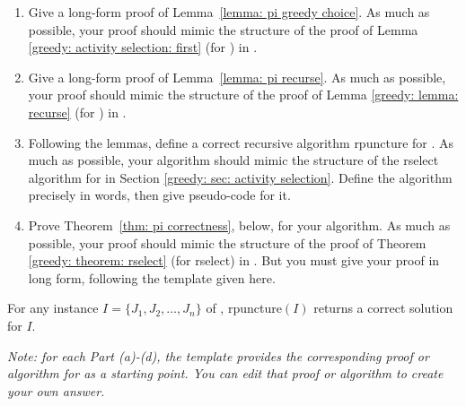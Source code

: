 \documentclass[11pt]{article}
\begin{document}
  \begin{enumerate}[label=(\alph*)]
  \item Give a long-form proof of Lemma~\ref{lemma: pi greedy choice}.
    As much as possible, your proof should mimic the structure of the proof of Lemma \ref{greedy: activity selection: first} (for )
    in .

  \item Give a long-form proof of Lemma~\ref{lemma: pi recurse}.
    As much as possible, your proof should mimic the structure of the proof of Lemma \ref{greedy: lemma: recurse} (for )
    in .

  \item Following the lemmas, 
    define a correct recursive algorithm \textsf{rpuncture} for .
    As much as possible, your algorithm should mimic the structure
    of the \textsf{rselect} algorithm for 
    in Section \ref{greedy: sec: activity selection}.
    Define the algorithm precisely in words, then give pseudo-code for it.

  \item Prove Theorem~\ref{thm: pi correctness}, below, for your algorithm.
    As much as possible, your proof should mimic the structure
    of the proof of Theorem \ref{greedy: theorem: rselect} (for \textsf{rselect}) in .
    But you must give your proof in long form, following the template given here.
\end{enumerate}

\begin{theorem}\label{thm: pi correctness}
  For any instance $I=\{J_1, J_2, \ldots, J_n\}$ of ,
  \textsf{rpuncture}${(I)}$ returns a correct solution for $I$.
\end{theorem}

\medskip

\emph{Note: for each Part (a)-(d), the template provides the corresponding proof or algorithm
  for  as a starting point.  You can edit that proof or algorithm to create
  your own answer.}

\setcounter{lemma}{0}
\setcounter{theorem}{0}

\continued

\continued

\continued

\end{document}
